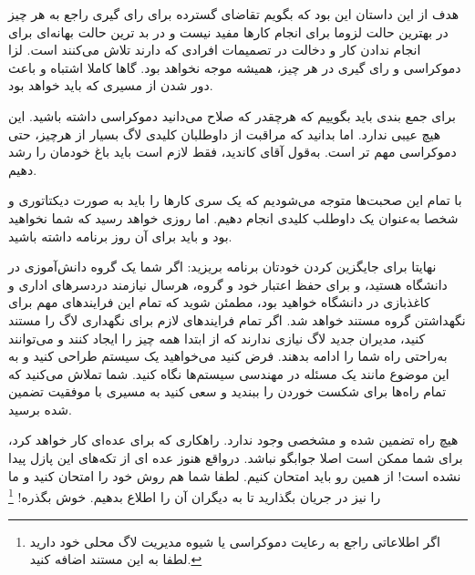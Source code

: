 هدف از این داستان این بود که بگویم تقاضای گسترده برای رای گیری راجع به هر چیز در بهترین حالت
لزوما برای انجام کار‌ها مفید نیست و در بد ترین حالت بهانه‌ای برای انجام ندادن کار و دخالت در تصمیمات
افرادی که دارند تلاش می‌کنند است. لزا دموکراسی و رای گیری در هر چیز، همیشه موجه نخواهد بود. گاها
کاملا اشتباه و باعث دور شدن از مسیری که باید خواهد بود.

برای جمع بندی باید بگوییم که هرچقدر که صلاح می‌دانید دموکراسی داشته باشید. این هیچ عیبی ندارد.
اما بدانید که مراقبت از داوطلبان کلیدی لاگ بسیار از هرچیز، حتی دموکراسی مهم تر است.
به‌قول آقای کاندید، فقط لازم است باید باغ خودمان را رشد دهیم.

با تمام این صحبت‌ها متوجه می‌شودیم که یک سری کارها را باید به صورت دیکتاتوری و شخصا به‌عنوان یک
داوطلب کلیدی انجام دهیم. اما روزی خواهد رسید که شما نخواهید بود و باید برای آن روز برنامه داشته باشید.

نهایتا برای جایگزین کردن خودتان برنامه بریزید: اگر شما یک گروه دانش‌آموزی در دانشگاه هستید، و برای
حفظ اعتبار خود و گروه، هرسال نیازمند دردسرهای اداری و کاغذبازی در دانشگاه خواهید بود، مطمئن شوید
که تمام این فرایندهای مهم برای نگهداشتن گروه مستند خواهد شد. اگر تمام فرایندهای لازم برای نگهداری
لاگ را مستند کنید، مدیران جدید لاگ نیازی ندارند که از ابتدا همه چیز را ایجاد کنند و می‌توانند به‌راحتی
راه شما را ادامه بدهند.
فرض کنید می‌خواهید یک سیستم طراحی کنید و به این موضوع مانند یک مسئله در مهندسی سیستم‌ها نگاه کنید.
شما تملاش می‌کنید که تمام راه‌ها برای شکست خوردن را ببندید و سعی کنید به مسیری با موفقیت تضمین شده برسید.

هیچ راه تضمین شده و مشخصی وجود ندارد. راهکاری که برای عده‌ای کار خواهد کرد، برای شما ممکن است
اصلا جوابگو نباشد. درواقع هنوز عده ای از تکه‌های این پازل پیدا نشده است! از همین رو باید امتحان کنیم.
لطفا شما هم روش خود را امتحان کنید و ما را نیز در جریان بگذارید تا به دیگران آن را اطلاع بدهیم.
خوش بگذره!
\footnote{
اگر اطلاعاتی راجع به رعایت دموکراسی یا شیوه مدیریت لاگ محلی خود دارید لطفا به این مستند اضافه کنید.
}


